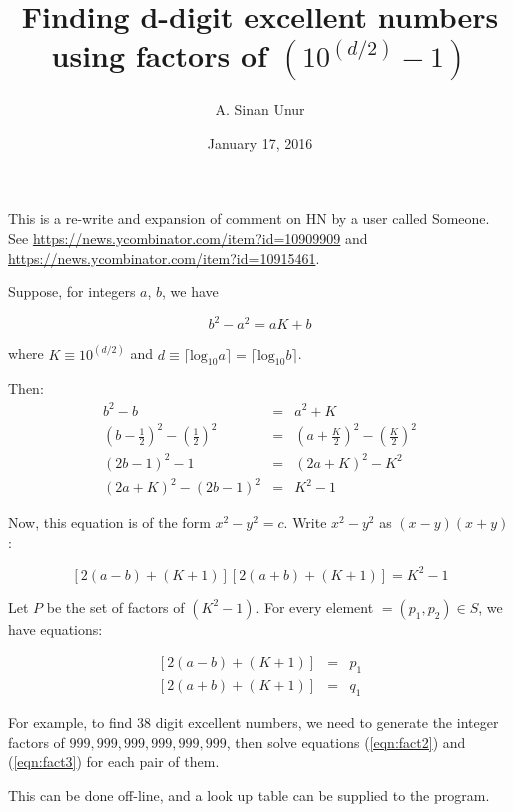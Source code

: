 \documentclass[12pt,letterpaper]{article}
\begin{document}
\title{Finding d-digit excellent numbers using factors of $(10^(d/2) - 1)$}

\author{A. Sinan Unur}

\date{January 17, 2016}

\maketitle

This is a re-write and expansion of comment on HN by a user called Someone. See \url{https://news.ycombinator.com/item?id=10909909} and \url{https://news.ycombinator.com/item?id=10915461}.

Suppose, for integers $a$, $b$, we have

\[ b^2 - a^2 = aK + b \]

where $K\equiv 10^(d/2)$ and $d\equiv\lceil\mathrm{log}_{10}a\rceil=\lceil\mathrm{log}_{10}b\rceil$.

Then:
%
\begin{eqnarray}
%
b^2 - b & = & a^2 + K \\
%
(b - \frac{1}{2})^2 - (\frac{1}{2})^2 & = & (a + \frac{K}{2})^2 - (\frac{K}{2})^2 \\
%
(2b - 1)^2 - 1 & = & (2a + K)^2 - K^2 \\
%
(2a + K)^2 - (2b - 1)^2 & = & K^2 - 1
%
\end{eqnarray}

Now, this equation is of the form $x^2 - y^2 = c$. Write $x^2 - y^2$ as $(x - y)(x + y)$:

\begin{equation}
%
\left[2(a - b) + (K + 1)\right] \left[2(a + b) + (K + 1)\right] = K^2 - 1 \label{eqn:fact1}
%
\end{equation}

Let $P$ be the set of factors of $(K^2 - 1)$. For every element $ = (p_1,p_2)\in S$, we have equations:

\begin{eqnarray}
%
\left[2(a - b) + (K + 1)\right] & = & p_1 \label{eqn:fact2}\\
%
\left[2(a + b) + (K + 1)\right] & = & q_1 \label{eqn:fact3}
%
\end{eqnarray}

For example, to find 38 digit excellent numbers, we need to generate the integer factors of $999,999,999,999,999,999$, then solve equations (\ref{eqn:fact2}) and (\ref{eqn:fact3}) for each pair of them.

This can be done off-line, and a look up table can be supplied to the program.
\end{document}
